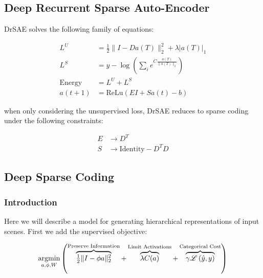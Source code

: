 \documentclass[smallextended]{svjour3}       %
\newcommand{\argmin}{\operatornamewithlimits{argmin}}
\begin{document}
\subsection{Deep Recurrent Sparse Auto-Encoder}
\noindent DrSAE solves the following family of equations:

\begin{displaymath}
\begin{aligned}
    L^{U} &= \tfrac{1}{2} \| I - D a(T) \|_{2}^{2} + \lambda |a(T)|_{1} \\
    L^{S} &= y - \log\left(\sum_{i}e^{C\frac{a(T)}{\|a(T)\|_{2}}}\right) \\
    \text{Energy} &= L^{U} + L^{S} \\
    a(t+1) &= \text{ReLu}(E I + S a(t) - b)
\end{aligned}
\end{displaymath}

\noindent when only considering the unsupervised loss, DrSAE reduces to sparse coding under the following constraints:

\begin{displaymath}
\begin{aligned}
E &\rightarrow D^T \\
S &\rightarrow \text{Identity} - D^TD
\end{aligned}
\end{displaymath}

\subsection{Deep Sparse Coding}
\subsubsection{Introduction}
\noindent Here we will describe a model for generating hierarchical representations of input scenes. First we add the supervised objective:

\begin{equation}\label{semi_supervised_energy}
\argmin\limits_{a, \phi, W}
        \left( 
            \overbrace{ \tfrac{1}{2} \| I - \phi a \|_{2}^{2} }^\text{Preserve Information} +
        \overbrace{ \lambda C(a) }^\text{Limit Activations}  +
        \overbrace{ \gamma \mathscr{L} \left(\hat{y}, y\right) }^\text{Categorical Cost}
        \right)
\end{equation}
\end{document}
